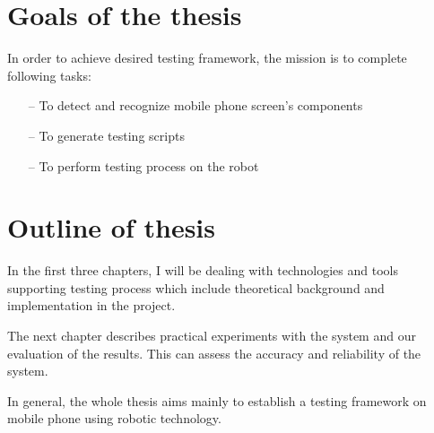 \section{Goals of the thesis}
In order to achieve desired testing framework, the mission is to complete following tasks:
	\begin{itemize}
		\item[--] To detect and recognize mobile phone screen's components
		\item[--] To generate testing scripts
		\item[--] To perform testing process on the robot
	\end{itemize}

\section{Outline of thesis}
In the first three chapters, I will be dealing with technologies and tools supporting testing process which include theoretical background and implementation in the project.

The next chapter describes practical experiments with the system and our evaluation of the results. This can assess the accuracy and reliability of the system.

In general, the whole thesis aims mainly to establish a testing framework on mobile phone using robotic technology. \nocite{radim_thesis}